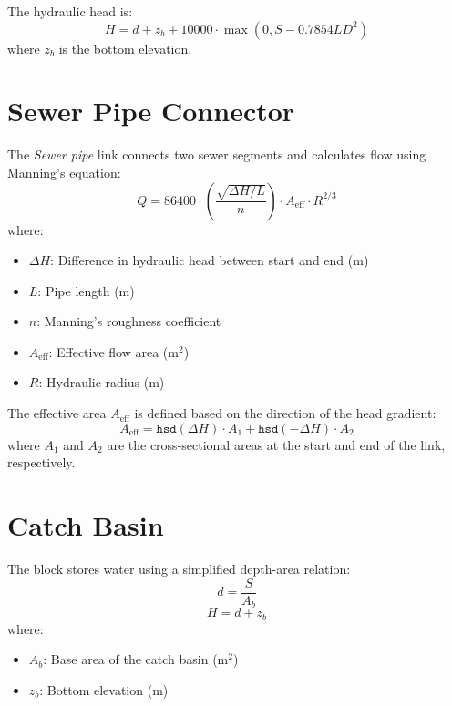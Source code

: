\documentclass[12pt]{report}
\begin{document}
The hydraulic head is:
\begin{equation}
H = d + z_b + 10000 \cdot \max(0, S - 0.7854 L D^2)
\end{equation}
where $z_b$ is the bottom elevation.

\section{Sewer Pipe Connector}

The \textit{Sewer pipe} link connects two sewer segments and calculates flow using Manning’s equation:
\begin{equation}
Q = 86400 \cdot \left(\frac{\sqrt{\Delta H / L}}{n}\right) \cdot A_{\text{eff}} \cdot R^{2/3}
\end{equation}
where:
\begin{itemize}
\item $\Delta H$: Difference in hydraulic head between start and end (m)
\item $L$: Pipe length (m)
\item $n$: Manning's roughness coefficient
\item $A_{\text{eff}}$: Effective flow area (m$^2$)
\item $R$: Hydraulic radius (m)
\end{itemize}

The effective area $A_{\text{eff}}$ is defined based on the direction of the head gradient:
\begin{equation}
A_{\text{eff}} = \texttt{hsd}(\Delta H) \cdot A_1 + \texttt{hsd}(-\Delta H) \cdot A_2
\end{equation}
where $A_1$ and $A_2$ are the cross-sectional areas at the start and end of the link, respectively.

\section{Catch Basin}

The  block stores water using a simplified depth-area relation:
\begin{equation}
d = \frac{S}{A_b}
\end{equation}
\begin{equation}
H = d + z_b
\end{equation}
where:
\begin{itemize}
\item $A_b$: Base area of the catch basin (m$^2$)
\item $z_b$: Bottom elevation (m)
\end{itemize}
\end{document}

